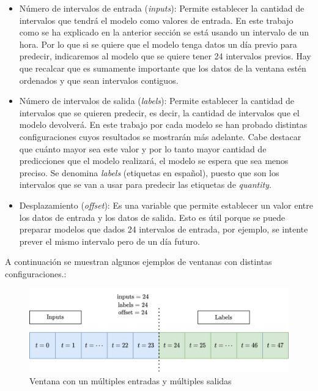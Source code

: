 \begin{itemize}
    \item Número de intervalos de entrada (\textit{inputs}): Permite establecer la cantidad de intervalos que tendrá el modelo como valores de entrada. En este trabajo como se ha explicado en la anterior sección se está usando un intervalo de un hora. Por lo que si se quiere que el modelo tenga datos un día previo para predecir, indicaremos al modelo que se quiere tener 24 intervalos previos. Hay que recalcar que es sumamente importante que los datos de la ventana estén ordenados y que sean intervalos contiguos.
    \newline
    
    \item Número de intervalos de salida (\textit{labels}): Permite establecer la cantidad de intervalos que se quieren predecir, es decir, la cantidad de intervalos que el modelo devolverá. En este trabajo por cada modelo se han probado distintas configuraciones cuyos resultados se mostrarán más adelante. Cabe destacar que cuánto mayor sea este valor y por lo tanto mayor cantidad de predicciones que el modelo realizará, el modelo se espera que sea menos preciso. Se denomina \textit{labels} (etiquetas en español), puesto que son los intervalos que se van a usar para predecir las etiquetas de \textit{quantity}.
    \newline
    
    \item Desplazamiento (\textit{offset}): Es una variable que permite establecer un valor entre los datos de entrada y los datos de salida. Esto es útil porque se puede preparar modelos que dados 24 intervalos de entrada, por ejemplo, se intente prever el mismo intervalo pero de un día futuro.
\end{itemize}

A continuación se muestran algunos ejemplos de ventanas con distintas configuraciones.:

\begin{figure}[H]
    \centering
    \includegraphics[width=12cm]{images/solution/modules/windows/windows-1.png}
    \caption{Ventana con un múltiples entradas y múltiples salidas}
\end{figure}


